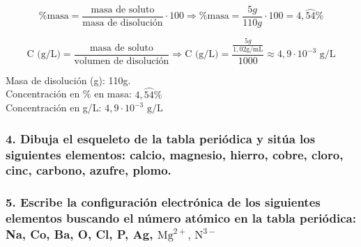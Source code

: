 \documentclass[12pt,a4paper]{article}
\begin{document}
\[
	\text{\% masa} = \frac{\text{masa de soluto}}{\text{masa de disolución}} \cdot 100 \Rightarrow \text{\% masa} = \frac{5g}{110g} \cdot 100 = 4,\wideparen{54}\%
\]

\[
	\text{C (g/L)} = \frac{\text{masa de soluto}}{\text{volumen de disolución}} \Rightarrow \text{C (g/L)} = \frac{\frac{5g}{1,02\text{g/mL}}}{1000} \approx 4,9 \cdot 10^{-3}\text{ g/L}
\]

\noindent Masa de disolución (g): 110g.\\
Concentración en \% en masa: \(4,\wideparen{54}\%\)\\
Concentración en g/L: \(4,9 \cdot 10^{-3}\text{ g/L}\)

\pagebreak

\subsubsection*{4. Dibuja el esqueleto de la tabla periódica y sitúa los siguientes elementos: calcio, magnesio, hierro, cobre, cloro, cinc, carbono, azufre, plomo.}

\begin{figure}[h]
	\centering
\end{figure}

\subsubsection*{5. Escribe la configuración electrónica de los siguientes elementos buscando el número atómico en la tabla periódica: Na, Co, Ba, O, Cl, P, Ag, \(\text{Mg}^{2+}\text{, N}^{3-}\)}
\end{document}
